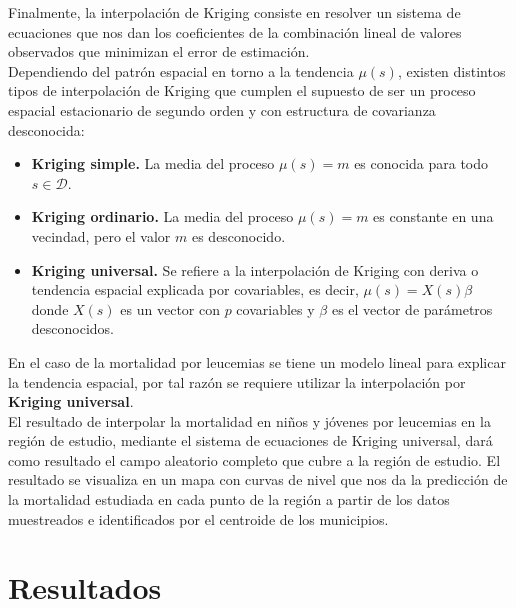 \documentclass[11pt, oneside]{book}
\begin{document}
\bigskip

Finalmente, la interpolación de Kriging consiste en resolver un sistema de ecuaciones que nos dan los coeficientes de la combinación lineal de valores observados que minimizan el error de estimación.\\


Dependiendo del patrón espacial en torno a la tendencia $\mu(s)$, existen distintos tipos de interpolación de Kriging que cumplen el supuesto de ser un proceso espacial estacionario de segundo orden y con estructura de covarianza desconocida:

\bigskip

\begin{itemize}
  \item \textbf{Kriging simple.} La media del proceso $\mu(s)=m$ es conocida para todo $s \in \mathcal{D}$.
  \item \textbf{Kriging ordinario.} La media del proceso $\mu(s)=m$ es constante en una vecindad, pero el valor $m$ es desconocido.
  \item \textbf{Kriging universal.} Se refiere a la interpolación de Kriging con deriva o tendencia espacial explicada por covariables, es decir, $\mu(s)=X(s)\beta$ donde $X(s)$ es un vector con $p$ covariables y $\beta$ es el vector de parámetros desconocidos.
\end{itemize}

\bigskip

En el caso de la mortalidad por leucemias se tiene un modelo lineal para explicar la tendencia espacial, por tal razón se requiere utilizar la interpolación por \textbf{Kriging universal}.\\

El resultado de interpolar la mortalidad en niños y jóvenes por leucemias en la región de estudio, mediante el sistema de ecuaciones de Kriging universal, dará como resultado el campo aleatorio completo que cubre a la región de estudio. El resultado se visualiza en un mapa con curvas de nivel que nos da la predicción de la mortalidad estudiada en cada punto de la región a partir de los datos muestreados e identificados por el centroide de los municipios.\\

\thispagestyle{empty}

\chapter{Resultados}
\end{document}

